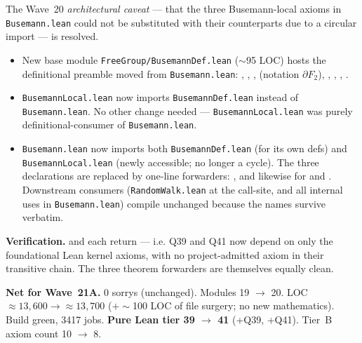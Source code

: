 \documentclass[11pt,a4paper]{article}
\newcommand{\lmod}[1]{\texttt{\small #1}}
\theoremstyle{plain}
\theoremstyle{definition}
\begin{document}
The Wave~20 \emph{architectural caveat} --- that the three Busemann-local
axioms in \lmod{Busemann.lean} could not be substituted with their
 counterparts due to a circular import --- is resolved.

\begin{itemize}[nosep]
  \item New base module \lmod{FreeGroup/BusemannDef.lean} ($\sim$95 LOC)
        hosts the definitional preamble moved from \lmod{Busemann.lean}:
        , , ,
         (notation $\partial F_2$),
        ,
        , ,
        .
  \item \lmod{BusemannLocal.lean} now imports \lmod{BusemannDef.lean}
        instead of \lmod{Busemann.lean}. No other change needed ---
        \lmod{BusemannLocal.lean} was purely definitional-consumer of
        \lmod{Busemann.lean}.
  \item \lmod{Busemann.lean} now imports both \lmod{BusemannDef.lean}
        (for its own defs) and \lmod{BusemannLocal.lean} (newly
        accessible; no longer a cycle). The three
         declarations are replaced by one-line
         forwarders:
        , and likewise for  and .
        Downstream consumers (\lmod{RandomWalk.lean} at the
         call-site, and all internal
        uses in \lmod{Busemann.lean}) compile unchanged because
        the names survive verbatim.
\end{itemize}

\textbf{Verification.}  and
 each
return
 ---
i.e. Q39 and Q41 now depend on only the foundational Lean kernel
axioms, with no project-admitted axiom in their transitive chain.
The three  theorem forwarders are themselves
equally clean.

\textbf{Net for Wave~21A.} 0 sorrys (unchanged). Modules 19 $\to$ 20.
LOC $\approx 13{,}600 \to \approx 13{,}700$ ($+\sim$100 LOC of file
surgery; no new mathematics). Build green, 3417 jobs. \textbf{Pure
Lean tier 39 $\to$ 41} (+Q39, +Q41). Tier~B axiom count 10 $\to$ 8.
\end{document}
